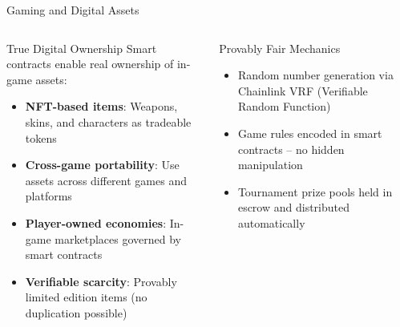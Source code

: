 \documentclass[8pt,aspectratio=169]{beamer}
\begin{document}
\begin{frame}{Gaming and Digital Assets}
\begin{columns}[T]
\begin{block}{True Digital Ownership}
\footnotesize
Smart contracts enable real ownership of in-game assets:
\begin{itemize}
  \item \textbf{NFT-based items}: Weapons, skins, and characters as tradeable tokens
  \item \textbf{Cross-game portability}: Use assets across different games and platforms
  \item \textbf{Player-owned economies}: In-game marketplaces governed by smart contracts
  \item \textbf{Verifiable scarcity}: Provably limited edition items (no duplication possible)
\end{itemize}
\end{block}
\vspace{2mm}
\begin{block}{Provably Fair Mechanics}
\footnotesize
\begin{itemize}
  \item Random number generation via Chainlink VRF (Verifiable Random Function)
  \item Game rules encoded in smart contracts -- no hidden manipulation
  \item Tournament prize pools held in escrow and distributed automatically
\end{itemize}
\end{block}


\end{columns}
\end{frame}
\end{document}
